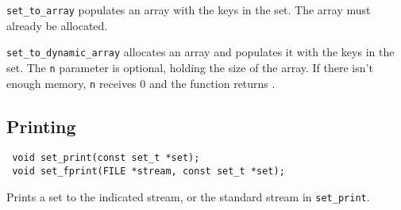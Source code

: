 \lstinline!set_to_array! populates an array with the keys in the set. The array must already be allocated. 

\lstinline!set_to_dynamic_array! allocates an array and populates it with the keys in the set. The \lstinline!n! parameter is optional, holding the
size of the array. If there isn't enough memory, \lstinline!n! receives 0 and the function returns \NULL.

\subsection{Printing}

\begin{lstlisting}
 void set_print(const set_t *set);
 void set_fprint(FILE *stream, const set_t *set);
\end{lstlisting}

 Prints a set to the indicated stream, or the standard stream in \lstinline!set_print!.